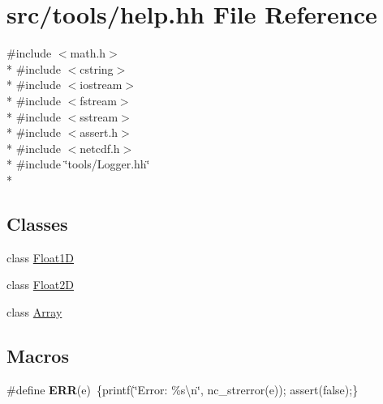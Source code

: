 \hypertarget{help_8hh}{\section{src/tools/help.hh File Reference}
\label{help_8hh}
}
{\ttfamily \#include $<$math.\-h$>$}\\*
{\ttfamily \#include $<$cstring$>$}\\*
{\ttfamily \#include $<$iostream$>$}\\*
{\ttfamily \#include $<$fstream$>$}\\*
{\ttfamily \#include $<$sstream$>$}\\*
{\ttfamily \#include $<$assert.\-h$>$}\\*
{\ttfamily \#include $<$netcdf.\-h$>$}\\*
{\ttfamily \#include \char`\"{}tools/\-Logger.\-hh\char`\"{}}\\*
\subsection*{Classes}
\begin{DoxyCompactItemize}
\item 
class \hyperlink{classFloat1D}{Float1\-D}
\item 
class \hyperlink{classFloat2D}{Float2\-D}
\item 
class \hyperlink{classArray}{Array}
\end{DoxyCompactItemize}
\subsection*{Macros}
\begin{DoxyCompactItemize}
\item 
\hypertarget{help_8hh_a588357de2986fdf4c1380190f7ae9f37}{\#define {\bfseries E\-R\-R}(e)~\{printf(\char`\"{}Error\-: \%s\textbackslash{}n\char`\"{}, nc\-\_\-strerror(e)); assert(false);\}}\label{help_8hh_a588357de2986fdf4c1380190f7ae9f37}

\end{DoxyCompactItemize}
